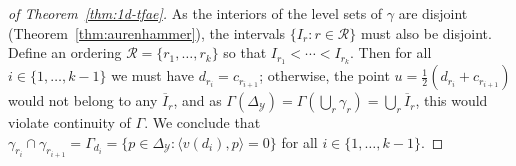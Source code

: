 \documentclass[anon]{colt2020} %
\newcommand{\simplex}{\Delta_\Y}
\newcommand{\R}{\mathcal{R}}
\newcommand{\Y}{\mathcal{Y}}
\newcommand{\inprod}[2]{\langle #1, #2 \rangle}%
\begin{document}
\begin{proof}[of Theorem~\ref{thm:1d-tfae}]
	As the interiors of the level sets of $\gamma$ are disjoint (Theorem~\ref{thm:aurenhammer}), the intervals $\{I_r:r\in\R\}$ must also be disjoint.
	Define an ordering $\R = \{r_1,\ldots,r_k\}$ so that $I_{r_1} < \cdots < I_{r_k}$.
	Then for all $i\in\{1,\ldots,k-1\}$ we must have $d_{r_i} = c_{r_{i+1}}$; otherwise, the point $u = \tfrac 1 2 (d_{r_i} + c_{r_{i+1}})$ would not belong to any $\overline I_r$, and as $\Gamma(\simplex) = \Gamma(\bigcup_r\gamma_r) = \bigcup_r \overline I_r$, this would violate continuity of $\Gamma$.
	We conclude that $\gamma_{r_i}\cap\gamma_{r_{i+1}} = \Gamma_{d_i} = \{p\in\simplex : \inprod{v(d_i)}{p} = 0\}$ for all $i\in\{1,\ldots,k-1\}$.
\end{proof}
\end{document}
